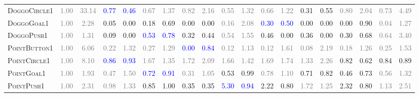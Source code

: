 \documentclass{article}
\begin{document}
\begin{table}[ht]
{\begin{tabular}{@{}l|cc|cc|cc|cc|cc|cc|cc|cc|cc@{}}
\textsc{DoggoCircle1} & \textcolor{gray}{1.00} & \textcolor{gray}{33.14} & \textcolor{blue}{0.77} & \textcolor{blue}{0.46} & \textcolor{gray}{0.67} & \textcolor{gray}{1.37} & \textcolor{gray}{0.82} & \textcolor{gray}{2.16} & \textcolor{gray}{0.55} & \textcolor{gray}{1.32} & \textcolor{gray}{0.66} & \textcolor{gray}{1.22} & 0.31 & 0.55 & \textcolor{gray}{0.80} & \textcolor{gray}{2.04} & \textcolor{gray}{0.73} & \textcolor{gray}{4.49} \\
\textsc{DoggoGoal1} & \textcolor{gray}{1.00} & \textcolor{gray}{2.28} & 0.05 & 0.00 & 0.18 & 0.69 & 0.00 & 0.00 & \textcolor{gray}{0.16} & \textcolor{gray}{2.08} & \textcolor{blue}{0.30} & \textcolor{blue}{0.50} & 0.00 & 0.00 & 0.00 & 0.90 & \textcolor{gray}{0.04} & \textcolor{gray}{1.27} \\
\textsc{DoggoPush1} & \textcolor{gray}{1.00} & \textcolor{gray}{1.31} & 0.09 & 0.00 & \textcolor{blue}{0.53} & \textcolor{blue}{0.78} & 0.32 & 0.44 & \textcolor{gray}{0.54} & \textcolor{gray}{1.55} & 0.46 & 0.00 & 0.36 & 0.00 & 0.30 & 0.68 & \textcolor{gray}{0.64} & \textcolor{gray}{3.40} \\
\textsc{PointButton1} & \textcolor{gray}{1.00} & \textcolor{gray}{6.06} & \textcolor{gray}{0.22} & \textcolor{gray}{1.32} & \textcolor{gray}{0.27} & \textcolor{gray}{1.29} & \textcolor{blue}{0.00} & \textcolor{blue}{0.84} & \textcolor{gray}{0.12} & \textcolor{gray}{1.13} & \textcolor{gray}{0.12} & \textcolor{gray}{1.61} & \textcolor{gray}{0.08} & \textcolor{gray}{2.19} & \textcolor{gray}{0.18} & \textcolor{gray}{1.26} & \textcolor{gray}{0.25} & \textcolor{gray}{1.53} \\
\textsc{PointCircle1} & \textcolor{gray}{1.00} & \textcolor{gray}{8.10} & \textcolor{blue}{0.86} & \textcolor{blue}{0.93} & \textcolor{gray}{1.67} & \textcolor{gray}{1.35} & \textcolor{gray}{1.72} & \textcolor{gray}{2.09} & \textcolor{gray}{1.66} & \textcolor{gray}{1.42} & \textcolor{gray}{1.69} & \textcolor{gray}{1.74} & \textcolor{gray}{1.33} & \textcolor{gray}{2.26} & 0.82 & 0.62 & 0.84 & 0.89 \\
\textsc{PointGoal1} & \textcolor{gray}{1.00} & \textcolor{gray}{1.93} & \textcolor{gray}{0.47} & \textcolor{gray}{1.50} & \textcolor{blue}{0.72} & \textcolor{blue}{0.91} & \textcolor{gray}{0.31} & \textcolor{gray}{1.05} & 0.53 & 0.99 & \textcolor{gray}{0.78} & \textcolor{gray}{1.10} & 0.71 & 0.82 & 0.46 & 0.73 & \textcolor{gray}{0.56} & \textcolor{gray}{1.32} \\
\textsc{PointPush1} & \textcolor{gray}{1.00} & \textcolor{gray}{2.31} & \textcolor{gray}{0.98} & \textcolor{gray}{1.33} & 0.85 & 1.00 & 0.35 & 0.35 & \textcolor{blue}{5.30} & \textcolor{blue}{0.94} & 2.22 & 0.80 & \textcolor{gray}{1.72} & \textcolor{gray}{1.25} & 2.32 & 0.80 & \textcolor{gray}{1.13} & \textcolor{gray}{2.51} \\

\end{tabular}}
\end{table}
\end{document}
